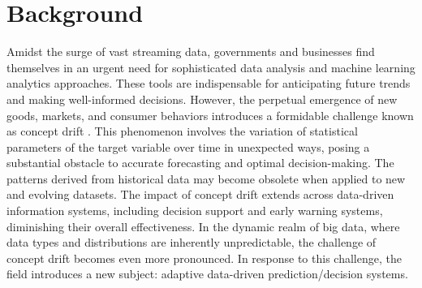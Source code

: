 \chapter{Background}\label{cha:2_background}

Amidst the surge of vast streaming data, governments and businesses find themselves in an urgent need for sophisticated data analysis and machine learning analytics approaches. These tools are indispensable for anticipating future trends and making well-informed decisions. However, the perpetual emergence of new goods, markets, and consumer behaviors introduces a formidable challenge known as concept drift \cite{widmer1996learning}. This phenomenon involves the variation of statistical parameters of the target variable over time in unexpected ways, posing a substantial obstacle to accurate forecasting and optimal decision-making. The patterns derived from historical data may become obsolete when applied to new and evolving datasets.
The impact of concept drift extends across data-driven information systems, including decision support and early warning systems, diminishing their overall effectiveness. In the dynamic realm of big data, where data types and distributions are inherently unpredictable, the challenge of concept drift becomes even more pronounced. In response to this challenge, the field introduces a new subject: adaptive data-driven prediction/decision systems.
